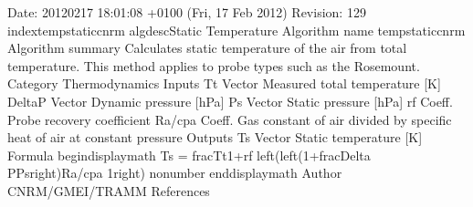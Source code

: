 \documentclass[a4paper,10pt,openany,english]{sphinxmanual}
\begin{document}
\begin{sphinxVerbatim}[commandchars=\\\{\}]
\PYGZpc{}\PYGZpc{} \PYGZdl{}Date: 2012\PYGZhy{}02\PYGZhy{}17 18:01:08 +0100 (Fri, 17 Feb 2012) \PYGZdl{}
\PYGZpc{}\PYGZpc{} \PYGZdl{}Revision: 129 \PYGZdl{}
\PYGZbs{}index\PYGZob{}temp\PYGZbs{}\PYGZus{}static\PYGZbs{}\PYGZus{}cnrm\PYGZcb{}
\PYGZbs{}algdesc\PYGZob{}Static Temperature\PYGZcb{}
\PYGZob{} \PYGZpc{}\PYGZpc{}\PYGZpc{}\PYGZpc{}\PYGZpc{}\PYGZpc{} Algorithm name \PYGZpc{}\PYGZpc{}\PYGZpc{}\PYGZpc{}\PYGZpc{}\PYGZpc{}
temp\PYGZbs{}\PYGZus{}static\PYGZbs{}\PYGZus{}cnrm
\PYGZcb{}
\PYGZob{} \PYGZpc{}\PYGZpc{}\PYGZpc{}\PYGZpc{}\PYGZpc{}\PYGZpc{} Algorithm summary \PYGZpc{}\PYGZpc{}\PYGZpc{}\PYGZpc{}\PYGZpc{}\PYGZpc{}
Calculates static temperature of the air from total temperature.  
This method applies to probe types such as the Rosemount.
\PYGZcb{}
\PYGZob{} \PYGZpc{}\PYGZpc{}\PYGZpc{}\PYGZpc{}\PYGZpc{}\PYGZpc{} Category \PYGZpc{}\PYGZpc{}\PYGZpc{}\PYGZpc{}\PYGZpc{}\PYGZpc{}
Thermodynamics
\PYGZcb{}
\PYGZob{} \PYGZpc{}\PYGZpc{}\PYGZpc{}\PYGZpc{}\PYGZpc{}\PYGZpc{} Inputs \PYGZpc{}\PYGZpc{}\PYGZpc{}\PYGZpc{}\PYGZpc{}\PYGZpc{}
\PYGZdl{}T\PYGZus{}t\PYGZdl{} \PYGZam{}	Vector \PYGZam{} Measured total temperature [K] \PYGZbs{}\PYGZbs{}
\PYGZdl{}\PYGZob{}\PYGZbs{}Delta\PYGZcb{}P\PYGZdl{} \PYGZam{} Vector \PYGZam{} Dynamic pressure [hPa] \PYGZbs{}\PYGZbs{}
\PYGZdl{}P\PYGZus{}s\PYGZdl{} \PYGZam{} Vector \PYGZam{} Static pressure [hPa] \PYGZbs{}\PYGZbs{}
\PYGZdl{}r\PYGZus{}f\PYGZdl{} \PYGZam{} Coeff. \PYGZam{} Probe recovery coefficient \PYGZbs{}\PYGZbs{} 
\PYGZdl{}R\PYGZus{}a/c\PYGZus{}\PYGZob{}pa\PYGZcb{}\PYGZdl{} \PYGZam{} Coeff. \PYGZam{} Gas constant of air divided by specific heat of air 
at constant pressure
\PYGZcb{}
\PYGZob{} \PYGZpc{}\PYGZpc{}\PYGZpc{}\PYGZpc{}\PYGZpc{}\PYGZpc{} Outputs \PYGZpc{}\PYGZpc{}\PYGZpc{}\PYGZpc{}\PYGZpc{}\PYGZpc{}
\PYGZdl{}T\PYGZus{}s\PYGZdl{} \PYGZam{} Vector \PYGZam{} Static temperature [K]
\PYGZcb{}
\PYGZob{} \PYGZpc{}\PYGZpc{}\PYGZpc{}\PYGZpc{}\PYGZpc{}\PYGZpc{} Formula \PYGZpc{}\PYGZpc{}\PYGZpc{}\PYGZpc{}\PYGZpc{}\PYGZpc{}
\PYGZbs{}begin\PYGZob{}displaymath\PYGZcb{}
 T\PYGZus{}s = \PYGZbs{}frac\PYGZob{}T\PYGZus{}t\PYGZcb{}\PYGZob{}1+r\PYGZus{}f \PYGZbs{}left(\PYGZbs{}left(1+\PYGZbs{}frac\PYGZob{}\PYGZbs{}Delta P\PYGZcb{}\PYGZob{}P\PYGZus{}s\PYGZcb{}\PYGZbs{}right)\PYGZca{}\PYGZob{}R\PYGZus{}a/c\PYGZus{}\PYGZob{}pa\PYGZcb{}\PYGZcb{}
 \PYGZhy{}1\PYGZbs{}right)\PYGZcb{} \PYGZbs{}nonumber
\PYGZbs{}end\PYGZob{}displaymath\PYGZcb{}
\PYGZcb{}
\PYGZob{} \PYGZpc{}\PYGZpc{}\PYGZpc{}\PYGZpc{}\PYGZpc{}\PYGZpc{} Author \PYGZpc{}\PYGZpc{}\PYGZpc{}\PYGZpc{}\PYGZpc{}\PYGZpc{}
CNRM/GMEI/TRAMM
\PYGZcb{}
\PYGZob{} \PYGZpc{}\PYGZpc{}\PYGZpc{}\PYGZpc{}\PYGZpc{}\PYGZpc{} References \PYGZpc{}\PYGZpc{}\PYGZpc{}\PYGZpc{}\PYGZpc{}\PYGZpc{}
\PYGZcb{}
\end{sphinxVerbatim}
\end{document}
